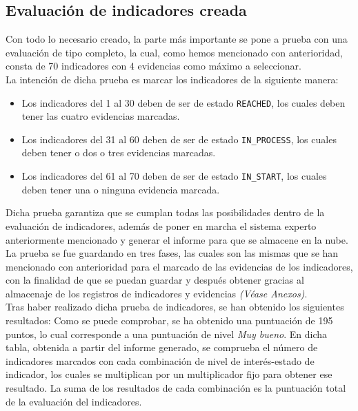 \subsection{Evaluación de indicadores creada}
Con todo lo necesario creado, la parte más importante se pone a prueba con una
evaluación de tipo completo, la cual, como hemos mencionado con anterioridad,
consta de 70 indicadores con 4 evidencias como máximo a seleccionar.
\\
La intención de dicha prueba es marcar los indicadores de la siguiente manera:
\begin{itemize}
    \item Los indicadores del 1 al 30 deben de ser de estado \texttt{REACHED}, los cuales deben tener las cuatro evidencias marcadas.
    \item Los indicadores del 31 al 60 deben de ser de estado \texttt{IN\_PROCESS}, los cuales deben tener o dos o tres evidencias marcadas.
    \item Los indicadores del 61 al 70 deben de ser de estado \texttt{IN\_START}, los cuales deben tener una o ninguna evidencia marcada.
\end{itemize}
Dicha prueba garantiza que se cumplan todas las posibilidades dentro de la
evaluación de indicadores, además de poner en marcha el sistema experto
anteriormente mencionado y generar el informe para que se almacene en la nube.
\\
La prueba se fue guardando en tres fases, las cuales son las mismas que se han
mencionado con anterioridad para el marcado de las evidencias de los
indicadores, con la finalidad de que se puedan guardar y después obtener gracias
al almacenaje de los registros de indicadores y evidencias \textit{(Véase
Anexos)}.
\\
Tras haber realizado dicha prueba de indicadores, se han obtenido los siguientes resultados:
Como se puede comprobar, se ha obtenido una puntuación de 195 puntos, lo cual
corresponde a una puntuación de nivel \textit{Muy bueno}. En dicha tabla,
obtenida a partir del informe generado, se comprueba el número de indicadores
marcados con cada combinación de nivel de interés-estado de indicador, los
cuales se multiplican por un multiplicador fijo para obtener ese resultado. La
suma de los resultados de cada combinación es la puntuación total de la evaluación del indicadores.